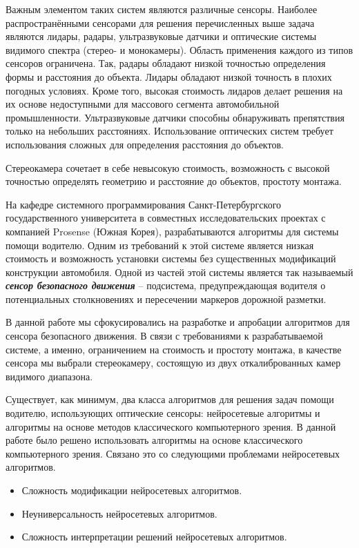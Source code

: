 \documentclass[aps,%
14pt,%
final,%
oneside,
onecolumn,%
musixtex, %
superscriptaddress,%
centertags]{extarticle} %
\begin{document}
Важным элементом таких систем являются различные сенсоры. Наиболее распространёнными сенсорами для решения перечисленных выше задача являются лидары, радары, ультразвуковые датчики и оптические системы видимого спектра (стерео- и монокамеры). Область применения каждого из типов сенсоров ограничена\cite{lu2005technical, ziebinski2016survey}. Так, радары обладают низкой точностью определения формы и расстояния до объекта. Лидары обладают низкой точность в плохих погодных условиях. Кроме того, высокая стоимость лидаров делает решения на их основе недоступными для массового сегмента автомобильной промышленности. Ультразвуковые датчики способны обнаруживать препятствия только на небольших расстояниях. Использование оптических систем требует использования сложных для определения расстояния до объектов. 

Стереокамера сочетает в себе невысокую стоимость, возможность с высокой точностью определять геометрию и расстояние до объектов, простоту монтажа.


На кафедре системного программирования Санкт-Петербургского государственного университета в совместных исследовательских проектах с компанией Prosense\cite{prosense} (Южная Корея), разрабатываются алгоритмы для системы помощи водителю. Одним из требований к этой системе является низкая стоимость и возможность установки системы без существенных модификаций конструкции автомобиля. Одной из частей этой системы является так называемый \textit{\textbf{сенсор безопасного движения}} -- подсистема, предупреждающая водителя о потенциальных столкновениях и пересечении маркеров дорожной разметки.

В данной работе мы сфокусировались на разработке и апробации алгоритмов для сенсора безопасного движения. В связи с требованиями к разрабатываемой системе, а именно, ограничением на стоимость и простоту монтажа, в качестве сенсора мы выбрали стереокамеру, состоящую из двух откалиброванных камер видимого диапазона.

Существует, как минимум, два класса алгоритмов для решения задач помощи водителю, использующих оптические сенсоры: нейросетевые алгоритмы и алгоритмы на основе методов классического компьютерного зрения. В данной работе было решено использовать алгоритмы на основе классического компьютерного зрения. Связано это со следующими проблемами нейросетевых алгоритмов\cite{lipton2016mythos}.
\begin{itemize}
\item Сложность модификации нейросетевых алгоритмов.
\item Неуниверсальность нейросетевых алгоритмов.
\item Сложность интерпретации решений нейросетевых алгоритмов.
\end{itemize}
\end{document}
